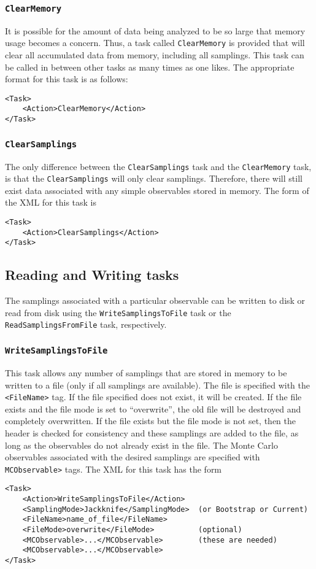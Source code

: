 \documentclass[12pt]{article}
\newcommand{\vb}{\texttt}
\begin{document}
\subsubsection{\vb{ClearMemory}}

It is possible
for the amount of data being analyzed to be so large that memory usage
becomes a concern. Thus, a task called \vb{ClearMemory} is
provided that will clear all accumulated data from memory, including
all samplings. This task can be called
in between other tasks as many times as one likes.
The appropriate format for
this task is as follows:
\begin{verbatim}
<Task>
    <Action>ClearMemory</Action>
</Task>
\end{verbatim}

\subsubsection{\vb{ClearSamplings}}
The only difference between the \vb{ClearSamplings} task and
the \vb{ClearMemory} task, is that the \vb{ClearSamplings} will
only clear samplings. Therefore, there will still exist data
associated with any simple observables stored in memory.
The form of the XML for this task is
\begin{verbatim}
<Task>
    <Action>ClearSamplings</Action>
</Task>
\end{verbatim}

\subsection{Reading and Writing tasks}

The samplings associated with a particular observable can be
written to disk or read from disk using the
\vb{WriteSamplingsToFile} task or the \vb{ReadSamplingsFromFile} task, respectively.

\subsubsection{\vb{WriteSamplingsToFile}}
This task allows any number of samplings that are stored in memory to be written
to a file (only if all samplings are available).
The file is specified with the \vb{<FileName>} tag.
If the file specified does not exist, it will be created. If the file
exists and the file mode is set to ``overwrite'', the old file will be destroyed
and completely overwritten.  If the file exists but the file mode is not set,
then the header is checked for consistency and these
samplings are added to the file, as long as the observables do
not already exist in the file.
The Monte Carlo observables associated with the desired samplings are
specified with \vb{MCObservable>} tags.
The XML for this task has the form
\begin{verbatim}
<Task>
    <Action>WriteSamplingsToFile</Action>
    <SamplingMode>Jackknife</SamplingMode>  (or Bootstrap or Current)
    <FileName>name_of_file</FileName>
    <FileMode>overwrite</FileMode>          (optional)
    <MCObservable>...</MCObservable>        (these are needed)
    <MCObservable>...</MCObservable>
</Task>
\end{verbatim}
\end{document}
